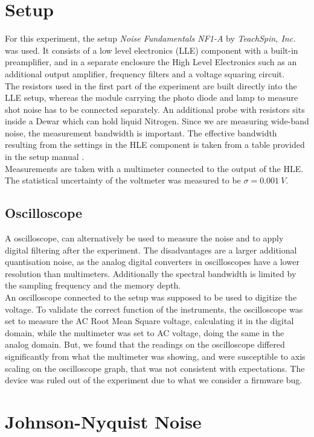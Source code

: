 \documentclass[
    parskip=half, 
    twoside=false,
    twocolumn=true,
    fontsize=11pt,
]{scrarticle}
\begin{document}
\section{Setup}
For this experiment, the setup \textit{Noise Fundamentals NF1-A} by \textit{TeachSpin, Inc.} was used. It consists of a low level electronics (LLE) component with a built-in preamplifier, and in a separate enclosure the High Level Electronics such as an additional output amplifier, frequency filters and a voltage squaring circuit.\\
The resistors used in the first part of the experiment are built directly into the LLE setup, whereas the module carrying the photo diode and lamp to measure shot noise has to be connected separately. An additional probe with resistors sits inside a Dewar which can hold liquid Nitrogen. Since we are measuring wide-band noise, the measurement bandwidth is important. The effective bandwidth resulting from the settings in the HLE component is taken from a table provided in the setup manual \autocite{instructions}.\\
Measurements are taken with a multimeter connected to the output of the HLE. The statistical uncertainty of the voltmeter was measured to be $\sigma = \SI{0.001}{V}$.

\subsection*{Oscilloscope}
A oscilloscope, can alternatively be used to measure the noise and to apply digital filtering after the experiment.
The disadvantages are a larger additional quantisation noise, as the analog digital converters in oscilloscopes have a lower resolution than multimeters.
Additionally the spectral bandwidth is limited by the sampling frequency and the memory depth.\\
An oscilloscope connected to the setup was supposed to be used to digitize the voltage.
To validate the correct function of the instruments, the oscilloscope was set to measure the AC Root Mean Square voltage, calculating it in the digital domain, while the multimeter was set to AC voltage, doing the same in the analog domain.
But, we found that the readings on the oscilloscope differed significantly from what the multimeter was showing, and were susceptible to axis scaling on the oscilloscope graph, that was not consistent with expectations.
The device was ruled out of the experiment due to what we consider a firmware bug.

\section{Johnson-Nyquist Noise}
\end{document}
